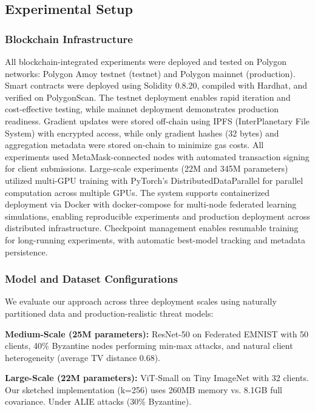 \documentclass[runningheads]{llncs}
\begin{document}
\subsection{Experimental Setup}

\subsubsection{Blockchain Infrastructure}

All blockchain-integrated experiments were deployed and tested on Polygon networks: Polygon Amoy testnet (testnet) and Polygon mainnet (production). Smart contracts were deployed using Solidity 0.8.20, compiled with Hardhat, and verified on PolygonScan. The testnet deployment enables rapid iteration and cost-effective testing, while mainnet deployment demonstrates production readiness. Gradient updates were stored off-chain using IPFS (InterPlanetary File System) with encrypted access, while only gradient hashes (32 bytes) and aggregation metadata were stored on-chain to minimize gas costs. All experiments used MetaMask-connected nodes with automated transaction signing for client submissions. Large-scale experiments (22M and 345M parameters) utilized multi-GPU training with PyTorch's DistributedDataParallel for parallel computation across multiple GPUs. The system supports containerized deployment via Docker with docker-compose for multi-node federated learning simulations, enabling reproducible experiments and production deployment across distributed infrastructure. Checkpoint management enables resumable training for long-running experiments, with automatic best-model tracking and metadata persistence.

\subsubsection{Model and Dataset Configurations}

We evaluate our approach across three deployment scales using naturally partitioned data and production-realistic threat models:

\textbf{Medium-Scale (25M parameters):} ResNet-50 on Federated EMNIST with 50 clients, 40\% Byzantine nodes performing min-max attacks, and natural client heterogeneity (average TV distance 0.68).

\textbf{Large-Scale (22M parameters):} ViT-Small on Tiny ImageNet with 32 clients. Our sketched implementation (k=256) uses 260MB memory vs. 8.1GB full covariance. Under ALIE attacks (30\% Byzantine).
\end{document}

